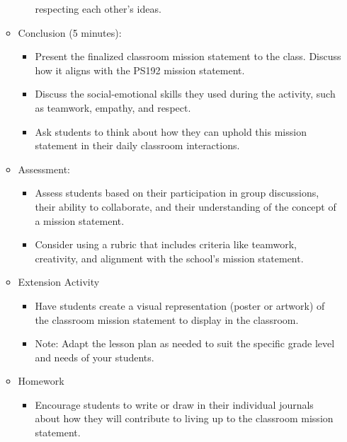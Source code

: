 \documentclass[14pt, letterpaper, twoside]{article}
\begin{document}
\begin{itemize}
\begin{itemize}
\begin{itemize}
													respecting each other's ideas.
									\end{itemize}
						\item Conclusion (5 minutes):
									\begin{itemize}
										\item Present the finalized classroom mission statement to the class. Discuss how it
													aligns with the PS192 mission statement.
										\item Discuss the social-emotional skills they used during the activity, such as
													teamwork, empathy, and respect.
										\item Ask students to think about how they can uphold this mission statement in their daily
													classroom interactions.
									\end{itemize}
						\item Assessment:
									\begin{itemize}
										\item Assess students based on their participation in group discussions, their ability
													to collaborate, and their understanding of the concept of a mission statement.
										\item Consider using a rubric that includes criteria like teamwork, creativity, and
													alignment with the school's mission statement.
									\end{itemize}
						\item Extension Activity
									\begin{itemize}
										\item Have students create a visual representation (poster or artwork) of the classroom
													mission statement to display in the classroom.
										\item Note: Adapt the lesson plan as needed to suit the specific grade level and needs
													of your students.
									\end{itemize}
						\item Homework
									\begin{itemize}
										\item Encourage students to write or draw in their individual journals about
													how they will contribute to living up to the classroom mission statement.
									\end{itemize}
					\end{itemize}
	\end{itemize}
\end{document}
